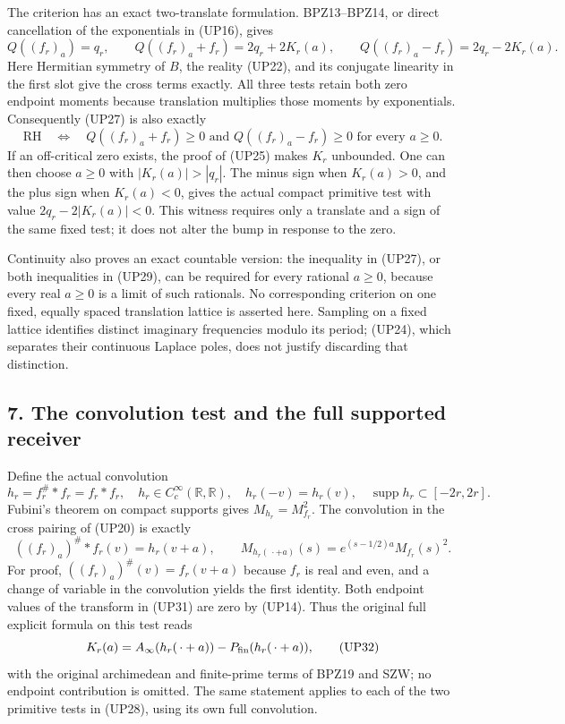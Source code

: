 \documentclass[
  10pt,
  a4paper,
]{article}
\begin{document}
The criterion has an exact two-translate formulation. BPZ13--BPZ14, or
direct cancellation of the exponentials in (UP16), gives \[
Q((f_r)_a)=q_r,
\qquad
Q((f_r)_a+f_r)=2q_r+2K_r(a),
\qquad
Q((f_r)_a-f_r)=2q_r-2K_r(a).
\tag{UP28}
\] Here Hermitian symmetry of \(B\), the reality (UP22), and its
conjugate linearity in the first slot give the cross terms exactly. All
three tests retain both zero endpoint moments because translation
multiplies those moments by exponentials. Consequently (UP27) is also
exactly \[
\mathrm{RH}\quad\Longleftrightarrow\quad
Q((f_r)_a+f_r)\ge0\text{ and }Q((f_r)_a-f_r)\ge0
\text{ for every }a\ge0.
\tag{UP29}
\] If an off-critical zero exists, the proof of (UP25) makes \(K_r\)
unbounded. One can then choose \(a\ge0\) with \(|K_r(a)|>|q_r|\). The
minus sign when \(K_r(a)>0\), and the plus sign when \(K_r(a)<0\), gives
the actual compact primitive test with value \(2q_r-2|K_r(a)|<0\). This
witness requires only a translate and a sign of the same fixed test; it
does not alter the bump in response to the zero.

Continuity also proves an exact countable version: the inequality in
(UP27), or both inequalities in (UP29), can be required for every
rational \(a\ge0\), because every real \(a\ge0\) is a limit of such
rationals. No corresponding criterion on one fixed, equally spaced
translation lattice is asserted here. Sampling on a fixed lattice
identifies distinct imaginary frequencies modulo its period; (UP24),
which separates their continuous Laplace poles, does not justify
discarding that distinction.

\subsection{7. The convolution test and the full supported
receiver}\label{the-convolution-test-and-the-full-supported-receiver}

Define the actual convolution \[
h_r=f_r^\#*f_r=f_r*f_r,
\quad h_r\in C_c^\infty(\mathbb R,\mathbb R),
\quad h_r(-v)=h_r(v),\quad
\operatorname{supp}h_r\subset[-2r,2r].
\tag{UP30}
\] Fubini's theorem on compact supports gives \(M_{h_r}=M_{f_r}^2\). The
convolution in the cross pairing of (UP20) is exactly \[
((f_r)_a)^\#*f_r(v)=h_r(v+a),\qquad
M_{h_r(\,\cdot+a)}(s)=e^{(s-1/2)a}M_{f_r}(s)^2.
\tag{UP31}
\] For proof, \(((f_r)_a)^\#(v)=f_r(v+a)\) because \(f_r\) is real and
even, and a change of variable in the convolution yields the first
identity. Both endpoint values of the transform in (UP31) are zero by
(UP14). Thus the original full explicit formula on this test reads \[
K_r(a)=A_\infty(h_r(\,\cdot+a))
-P_{\rm fin}(h_r(\,\cdot+a)),
\tag{UP32}
\] with the original archimedean and finite-prime terms of BPZ19 and
SZW; no endpoint contribution is omitted. The same statement applies to
each of the two primitive tests in (UP28), using its own full
convolution.
\end{document}
